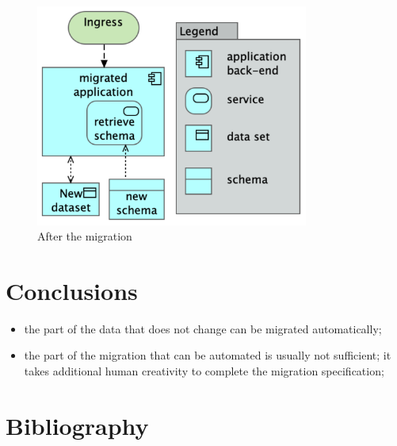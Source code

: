 \documentclass{elsarticle}
\begin{document}
\begin{figure}
   \centering
   \includegraphics[width=0.8\textwidth]{figures/After migration.png}
   \caption{After the migration}
   \label{fig:after}
\end{figure}

\section{Conclusions}
\begin{itemize}
   \item the part of the data that does not change can be migrated automatically;
   \item the part of the migration that can be automated is usually not sufficient;
         it takes additional human creativity to complete the migration specification;
\end{itemize}
\section{Bibliography}


\end{document}
